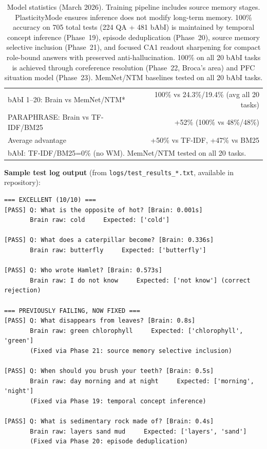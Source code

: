 \documentclass[11pt]{article}
\begin{document}
\begin{table}[h]
\begin{tabular}{lr}
bAbI 1--20: Brain vs MemNet/NTM* & 100\% vs 24.3\%/19.4\% (avg all 20 tasks) \\
PARAPHRASE: Brain vs TF-IDF/BM25 & +52\% (100\% vs 48\%/48\%) \\
Average advantage & +50\% vs TF-IDF, +47\% vs BM25 \\
\multicolumn{2}{l}{\footnotesize *bAbI: TF-IDF/BM25=0\% (no WM). MemNet/NTM tested on all 20 tasks.} \\
\bottomrule
\end{tabular}
\caption{Model statistics (March 2026). Training pipeline includes source memory stages. PlasticityMode ensures inference does not modify long-term memory. 100\% accuracy on 705 total tests (224 QA + 481 bAbI) is maintained by temporal concept inference (Phase~19), episode deduplication (Phase~20), source memory selective inclusion (Phase~21), and focused CA1 readout sharpening for compact role-bound answers with preserved anti-hallucination. 100\% on all 20 bAbI tasks is achieved through coreference resolution (Phase~22, Broca's area) and PFC situation model (Phase~23). MemNet/NTM baselines tested on all 20 bAbI tasks.}
\end{table}

\textbf{Sample test log output} (from \texttt{logs/test\_results\_*.txt}, available in repository):

{\small
\begin{verbatim}
=== EXCELLENT (10/10) ===
[PASS] Q: What is the opposite of hot? [Brain: 0.001s]
       Brain raw: cold     Expected: ['cold']

[PASS] Q: What does a caterpillar become? [Brain: 0.336s]
       Brain raw: butterfly     Expected: ['butterfly']

[PASS] Q: Who wrote Hamlet? [Brain: 0.573s]
       Brain raw: I do not know     Expected: ['not know'] (correct rejection)

=== PREVIOUSLY FAILING, NOW FIXED ===
[PASS] Q: What disappears from leaves? [Brain: 0.8s]
       Brain raw: green chlorophyll     Expected: ['chlorophyll', 'green']
       (Fixed via Phase 21: source memory selective inclusion)

[PASS] Q: When should you brush your teeth? [Brain: 0.5s]
       Brain raw: day morning and at night     Expected: ['morning', 'night']
       (Fixed via Phase 19: temporal concept inference)

[PASS] Q: What is sedimentary rock made of? [Brain: 0.4s]
       Brain raw: layers sand mud     Expected: ['layers', 'sand']
       (Fixed via Phase 20: episode deduplication)
\end{verbatim}
}
\end{document}
